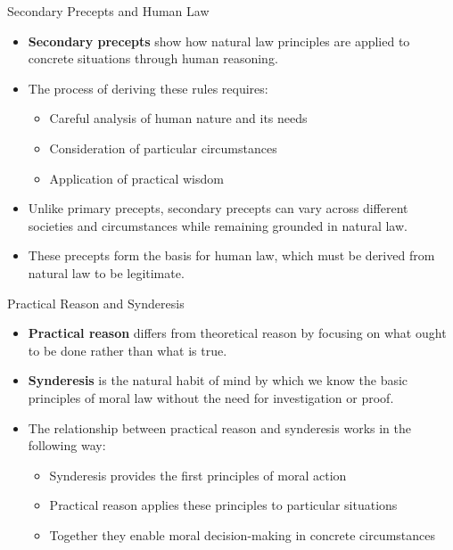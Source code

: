 \documentclass{beamer}
\begin{document}
\begin{frame}{Secondary Precepts and Human Law}
    \begin{itemize}
        \item \textbf{Secondary precepts} show how natural law principles are applied to concrete situations through human reasoning.
        
        \item The process of deriving these rules requires:
        \begin{itemize}
            \item Careful analysis of human nature and its needs
            \item Consideration of particular circumstances
            \item Application of practical wisdom
        \end{itemize}
        
        \item Unlike primary precepts, secondary precepts can vary across different societies and circumstances while remaining grounded in natural law.
        
        \item These precepts form the basis for human law, which must be derived from natural law to be legitimate.
    \end{itemize}
\end{frame}

\begin{frame}{Practical Reason and Synderesis}
    \begin{itemize}
        \item \textbf{Practical reason} differs from theoretical reason by focusing on what ought to be done rather than what is true.
        
        \item \textbf{Synderesis} is the natural habit of mind by which we know the basic principles of moral law without the need for investigation or proof.
        
        \item The relationship between practical reason and synderesis works in the following way:
        \begin{itemize}
            \item Synderesis provides the first principles of moral action
            \item Practical reason applies these principles to particular situations
            \item Together they enable moral decision-making in concrete circumstances
        \end{itemize}
    \end{itemize}
\end{frame}
\end{document}
